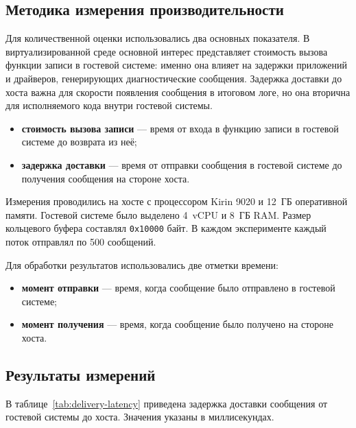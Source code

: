 \subsection{Методика измерения производительности}
\label{sec:ch5-method}

Для количественной оценки использовались два основных показателя. В
виртуализированной среде основной интерес представляет стоимость вызова функции
записи в гостевой системе: именно она влияет на задержки приложений и драйверов,
генерирующих диагностические сообщения. Задержка доставки до хоста важна для
скорости появления сообщения в итоговом логе, но она вторична для исполняемого
кода внутри гостевой системы.

\begin{itemize}
    \item \textbf{стоимость вызова записи} --- время от входа в функцию записи
    в гостевой системе до возврата из неё;
    \item \textbf{задержка доставки} --- время от отправки сообщения в гостевой
    системе до получения сообщения на стороне хоста.
\end{itemize}

Измерения проводились на хосте с процессором Kirin 9020 и 12~ГБ оперативной
памяти. Гостевой системе было выделено 4~vCPU и 8~ГБ RAM. Размер кольцевого
буфера составлял \texttt{0x10000} байт. В каждом эксперименте каждый поток
отправлял по 500 сообщений.

Для обработки результатов использовались две отметки времени:
\begin{itemize}
    \item \textbf{момент отправки} --- время, когда сообщение было отправлено в
    гостевой системе;
    \item \textbf{момент получения} --- время, когда сообщение было получено на
    стороне хоста.
\end{itemize}

\subsection{Результаты измерений}
\label{sec:ch5-results-template}

В таблице~\ref{tab:delivery-latency} приведена задержка доставки сообщения от
гостевой системы до хоста. Значения указаны в миллисекундах.

